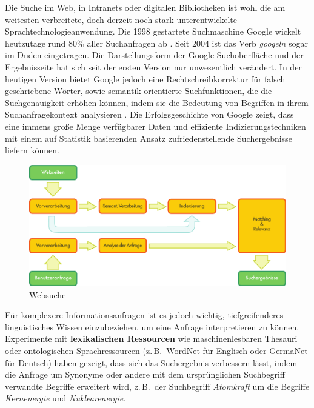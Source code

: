 \begin{multicols}{2}
Die Suche im Web, in Intranets oder digitalen Bibliotheken ist wohl die am weitesten verbreitete, doch derzeit noch stark unterentwickelte Sprachtechnologieanwendung. Die 1998 gestartete Suchmaschine Google wickelt heutzutage rund 80\% aller Suchanfragen ab \cite{spi1}. Seit 2004 ist das Verb \textit{googeln} sogar im Duden eingetragen. Die Darstellungsform der Google-Such\-ober\-fläche und der Ergebnisseite hat sich seit der ersten Version nur unwesentlich verändert. In der heutigen Version bietet Google jedoch eine Rechtschreibkorrektur für falsch geschriebene Wörter, sowie se\-man\-tik-orien\-tier\-te Suchfunktionen, die die Suchgenauigkeit erhöhen können, indem sie die Bedeutung von Begriffen in ihrem Suchanfragekontext analysieren  \cite{pc1}. Die Erfolgsgeschichte von Google zeigt, dass eine immens große Menge verfügbarer Daten und effiziente Indizierungstechniken mit einem auf Statistik basierenden Ansatz zufriedenstellende Suchergebnisse liefern können.

\begin{figure}[htb]
  \center
  \includegraphics[width=\textwidth]{../_media/german/web_search_architecture}
  \caption{Websuche}
  \label{fig:websearcharch_de}
\end{figure}

Für komplexere Informationsanfragen ist es jedoch wichtig, tiefgreifenderes linguistisches Wissen einzubeziehen, um eine Anfrage interpretieren zu können. Experimente mit \textbf{lexikalischen Ressourcen} wie maschinenlesbaren Thesauri oder ontologischen Sprachressourcen (z.\,B.~WordNet für Englisch oder GermaNet für Deutsch) haben gezeigt, dass sich das Suchergebnis verbessern lässt, indem die Anfrage um Synonyme oder andere mit dem ursprünglichen Suchbegriff verwandte Begriffe erweitert wird, z.\,B.~der Suchbegriff \textit{Atomkraft} um die Begriffe \textit{Kernenergie} und \textit{Nuklearenergie}. 


\end{multicols}
